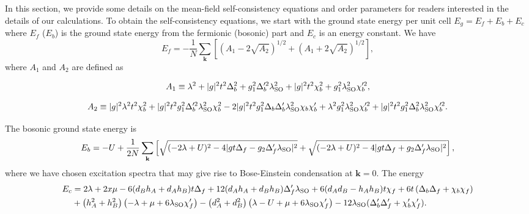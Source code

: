 \documentclass[aps,prb,twocolumn,superscriptaddress,showpacs]{revtex4-1}
\begin{document}
In this section, we provide some details on the mean-field self-consistency equations and order parameters for readers interested in the details of our calculations. To obtain the self-consistency equations, we start with the ground state energy per unit cell $E_g = E_f+E_b+E_{c}$
where $E_f$ ($E_b$) is the ground state energy from the fermionic (bosonic) part and $E_c$ is an energy constant. We have
\begin{equation}
\label{Ef}
E_f = - \frac{1}{N}\sum_{\textbf{k}}\left[\left( A_1 -2 \sqrt{A_2}\right)^{1/2} + \left(A_1 +2 \sqrt{A_2}\right)^{1/2}\right],
\end{equation}
where $A_1$ and $A_2$ are defined as
\begin{widetext}
\begin{equation}
A_1 \equiv \lambda^2+|g|^2 t^2 \Delta_b^2+g_1^2 \Delta_{b}^{\prime 2} \lambda_{\rm{SO}}^2+|g|^2 t^2 \chi_b^2+g_1^2 \lambda_{\rm{SO}}^2 \chi_{b}^{\prime 2},
\end{equation}

\begin{equation}
A_2 \equiv  |g|^2 \lambda^2 t^2 \chi _b^2+|g|^2 t^2 g_1^2 \Delta_{b}^{\prime 2} \lambda_{\rm{SO}}^2 \chi _b^2-2 |g|^2 t^2 g_1^2 \Delta _b \Delta_{b}^{\prime} \lambda_{\rm{SO}}^2 \chi _b \chi_{b}^{\prime}+\lambda^2 g_1^2 \lambda_{\rm{SO}}^2 \chi_{b}^{\prime 2}+|g|^2 t^2 g_1^2 \Delta _b^2 \lambda_{\rm{SO}}^2 \chi_{b}^{\prime 2}.
\end{equation}

The bosonic ground state energy is
\begin{eqnarray}
\label{Eb}
E_b = -U+\frac{1}{2N}\sum_{\textbf{k}}\left [\sqrt{(-2 \lambda+U)^2-4 |g t \Delta _f- g_2 \Delta_{f}^{\prime} \lambda_{\rm{SO}}|^2}+\sqrt{(-2 \lambda+U)^2-4 |g t \Delta _f+ g_2 \Delta_{f}^{\prime} \lambda_{\rm{SO}}|^2} \right ],
\end{eqnarray}
where we have chosen excitation spectra\cite{RipkaBook:1986} that may give rise to Bose-Einstein condensation at $\textbf{k}=0$. The energy
\begin{eqnarray}
\label{Ec}
E_c &=  2 \lambda+2 x \mu -6 (d_B h_A+d_A h_B) t \Delta _f+12 (d_A h_A+d_B h_B) \Delta_{f}^{\prime} \lambda_{\rm{SO}}+6 (d_A d_B-h_A h_B) t \chi _f
+6 t \left(\Delta _b \Delta _f+\chi _b \chi _f\right) \nonumber \\ &+\left(h_A^2+h_B^2\right) \left(-\lambda+\mu +6 \lambda_{\rm{SO}} \chi_{f}^{\prime}\right) -\left(d_A^2+d_B^2\right) \left(\lambda-U+\mu +6 \lambda_{\rm{SO}} \chi_{f}^{\prime}\right)-12 \lambda_{\rm{SO}}(\Delta_{b}^{\prime} \Delta_{f}^{\prime}+\chi_{b}^{\prime} \chi_{f}^{\prime}).
\end{eqnarray}


\end{widetext}
\end{document}
